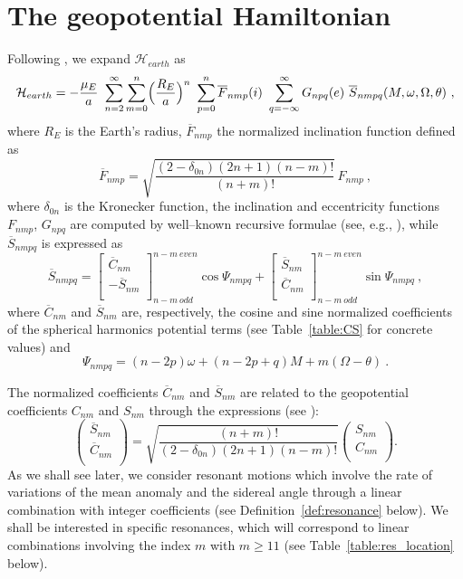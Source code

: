 \documentclass[12pt,reqno]{amsart}
\numberwithin{equation}{section}
\newcommand\beq[1]{ \begin{equation}\label{#1} }
\newcommand{\eeq}{ \end{equation} }
\begin{document}
\section{The geopotential Hamiltonian} \label{sec:geopotential_Ham}

Following \cite{Kaula}, we expand $\mathcal{H}_{earth}$ as
\beq{Rearth}
\mathcal{H}_{earth}=- {{\mu_E}\over a}\ \sum_{n=2}^\infty \sum_{m=0}^n \Bigl({R_E\over a}\Bigr)^n\ \sum_{p=0}^n \overline{F}_{nmp}(i)\
\sum_{q=-\infty}^\infty G_{npq}(e)\ \overline{S}_{nmpq}(M,\omega,\Omega,\theta)\ ,
\eeq
where $R_E$ is the Earth's radius,  $\overline{F}_{nmp}$ the normalized inclination function defined as
$$
\overline{F}_{nmp}=\sqrt{\frac{(2-\delta_{0n}) (2n+1)(n-m)!}{(n+m)!}}\, F_{nmp}\ ,
$$
where $\delta_{0n}$ is the Kronecker function, the inclination and eccentricity functions
$F_{nmp}$, $G_{npq}$ are computed by well--known recursive formulae
(see, e.g., \cite{Kaula, Chao, CGmajor}), while
   $\overline{S}_{nmpq}$ is expressed as
\beq{Snmpq}
\overline{S}_{nmpq}=\left[%
\begin{array}{c}
  \overline{C}_{nm} \\
  -\overline{S}_{nm} \\
 \end{array}%
\right]_{n-m \ odd}^{n-m \ even} \cos \Psi_{nmpq}+ \left[%
\begin{array}{c}
  \overline{S}_{nm} \\
  \overline{C}_{nm} \\
 \end{array}%
\right]_{n-m \ odd}^{n-m \ even} \sin \Psi_{nmpq}\ ,
\eeq
where $\overline{C}_{nm}$ and $\overline{S}_{nm}$ are, respectively, the cosine and sine normalized coefficients of the spherical harmonics potential terms (see Table~\ref{table:CS} for concrete values) and
\beq{psi}
\Psi_{nmpq}=(n-2p) \omega+(n-2p+q)M+m(\Omega-\theta)\ .
\eeq

The normalized coefficients $\overline{C}_{nm}$ and $\overline{S}_{nm}$ are related to the geopotential
coefficients $C_{nm}$ and $S_{nm}$ through the expressions (see \cite{Kaula, MG}):
$$
\left(%
\begin{array}{c}
  \overline{S}_{nm} \\
  \overline{C}_{nm} \\
 \end{array}%
\right)= \sqrt{\frac{(n+m)!}{(2-\delta_{0n}) (2n+1)(n-m)!}}
\left(%
\begin{array}{c}
  {S}_{nm} \\
  {C}_{nm} \\
 \end{array}%
\right).
$$
As we shall see later, we consider resonant motions which involve the rate of variations
of the mean anomaly and the sidereal angle through a linear combination with integer coefficients
(see Definition~\ref{def:resonance} below). We shall be  interested in specific resonances,
which will correspond to linear combinations involving the index $m$ with $m\geq 11$ (see Table~\ref{table:res_location}
below).
\end{document}
